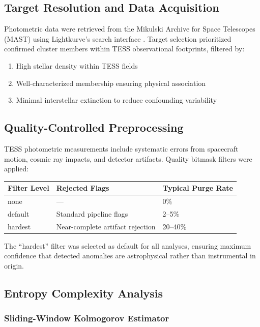 \documentclass[twocolumn,10pt]{article}
\begin{document}
\subsection{Target Resolution and Data Acquisition}

Photometric data were retrieved from the Mikulski Archive for Space Telescopes (MAST) using Lightkurve's search interface \citep{lightkurve2018}. Target selection prioritized confirmed cluster members within TESS observational footprints, filtered by:
\begin{enumerate}
    \item High stellar density within TESS fields
    \item Well-characterized membership ensuring physical association
    \item Minimal interstellar extinction to reduce confounding variability
\end{enumerate}

\subsection{Quality-Controlled Preprocessing}

TESS photometric measurements include systematic errors from spacecraft motion, cosmic ray impacts, and detector artifacts. Quality bitmask filters were applied:

\begin{center}
\begin{tabular}{lll}
\toprule
Filter Level & Rejected Flags & Typical Purge Rate \\
\midrule
none & — & 0\% \\
default & Standard pipeline flags & 2–5\% \\
hardest & Near-complete artifact rejection & 20–40\% \\
\bottomrule
\end{tabular}
\end{center}

The ``hardest'' filter was selected as default for all analyses, ensuring maximum confidence that detected anomalies are astrophysical rather than instrumental in origin.

\subsection{Entropy Complexity Analysis}

\subsubsection{Sliding-Window Kolmogorov Estimator}
\end{document}
